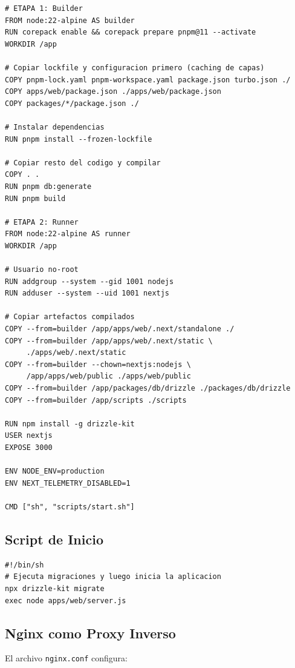 \begin{lstlisting}[style=bash, caption=Dockerfile - Build multi-etapa]
# ETAPA 1: Builder
FROM node:22-alpine AS builder
RUN corepack enable && corepack prepare pnpm@11 --activate
WORKDIR /app

# Copiar lockfile y configuracion primero (caching de capas)
COPY pnpm-lock.yaml pnpm-workspace.yaml package.json turbo.json ./
COPY apps/web/package.json ./apps/web/package.json
COPY packages/*/package.json ./

# Instalar dependencias
RUN pnpm install --frozen-lockfile

# Copiar resto del codigo y compilar
COPY . .
RUN pnpm db:generate
RUN pnpm build

# ETAPA 2: Runner
FROM node:22-alpine AS runner
WORKDIR /app

# Usuario no-root
RUN addgroup --system --gid 1001 nodejs
RUN adduser --system --uid 1001 nextjs

# Copiar artefactos compilados
COPY --from=builder /app/apps/web/.next/standalone ./
COPY --from=builder /app/apps/web/.next/static \
     ./apps/web/.next/static
COPY --from=builder --chown=nextjs:nodejs \
     /app/apps/web/public ./apps/web/public
COPY --from=builder /app/packages/db/drizzle ./packages/db/drizzle
COPY --from=builder /app/scripts ./scripts

RUN npm install -g drizzle-kit
USER nextjs
EXPOSE 3000

ENV NODE_ENV=production
ENV NEXT_TELEMETRY_DISABLED=1

CMD ["sh", "scripts/start.sh"]
\end{lstlisting}

\subsection{Script de Inicio}

\begin{lstlisting}[style=bash, caption=scripts/start.sh]
#!/bin/sh
# Ejecuta migraciones y luego inicia la aplicacion
npx drizzle-kit migrate
exec node apps/web/server.js
\end{lstlisting}

\subsection{Nginx como Proxy Inverso}

El archivo \texttt{nginx.conf} configura:

